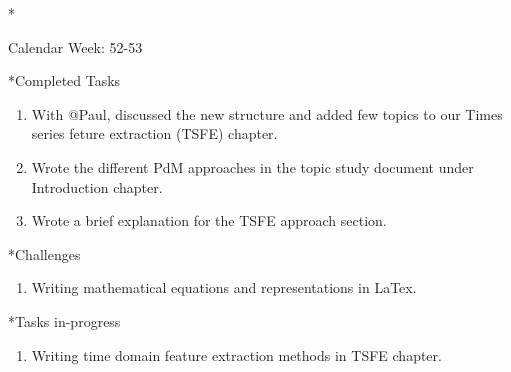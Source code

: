 \documentclass[11pt,a4paper]{article}
\begin{document}
\newpage
\begin{section}*{Calendar Week: 52-53 \hfill \date{30 December, 2020}}
 \begin{subsection}*{Completed Tasks}
     \begin{enumerate}
         \item
               With @Paul, discussed the new structure and added few topics to our Times series feture extraction (TSFE) chapter.
         \item
               Wrote the different PdM approaches in the topic study document under Introduction chapter.
         \item
               Wrote a brief explanation for the TSFE approach section.
     \end{enumerate}
 \end{subsection}

 \begin{subsection}*{Challenges}
     \begin{enumerate}
         \item
               Writing mathematical equations and representations in LaTex.
     \end{enumerate}
 \end{subsection}

 \begin{subsection}*{Tasks in-progress}
     \begin{enumerate}
         \item
               Writing time domain feature extraction methods in TSFE chapter.
     \end{enumerate}
 \end{subsection}
\end{section}
\end{document}
